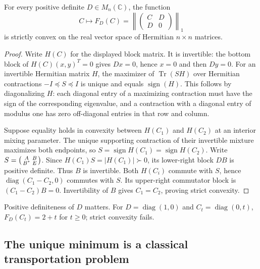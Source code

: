 \begin{lemma}\label{lem:strict-saddle}
For every positive definite $D\in M_n(\mathbb C)$, the function
\[
 C\longmapsto F_D(C)=
 \left\|\begin{pmatrix}C&D\\D&0\end{pmatrix}\right\|_1
\]
is strictly convex on the real vector space of Hermitian $n\times n$
matrices.
\end{lemma}
\begin{proof}
Write $H(C)$ for the displayed block matrix. It is invertible: the bottom
block of $H(C)(x,y)^T=0$ gives $Dx=0$, hence $x=0$ and then $Dy=0$.
For an invertible Hermitian matrix $H$, the maximizer of
$\operatorname{Tr}(SH)$ over Hermitian contractions $-I\preceq S\preceq I$
is unique and equals $\operatorname{sign}(H)$. This follows by diagonalizing
$H$: each diagonal entry of a maximizing contraction must have the sign
of the corresponding eigenvalue, and a contraction with a diagonal entry
of modulus one has zero off-diagonal entries in that row and column.

Suppose equality holds in convexity between $H(C_1)$ and $H(C_2)$ at an
interior mixing parameter. The unique supporting contraction of their
invertible mixture maximizes both endpoints, so
$S=\operatorname{sign}H(C_1)=\operatorname{sign}H(C_2)$.
Write $S=\begin{psmallmatrix}A&B\\B^*&E\end{psmallmatrix}$.
Since $H(C_1)S=|H(C_1)|\succ0$, its lower-right block $DB$ is positive
definite. Thus $B$ is invertible. Both $H(C_i)$ commute with $S$, hence
$\operatorname{diag}(C_1-C_2,0)$ commutes with $S$. Its upper-right
commutator block is $(C_1-C_2)B=0$. Invertibility of $B$ gives
$C_1=C_2$, proving strict convexity.
\end{proof}

Positive definiteness of $D$ matters. For
$D=\operatorname{diag}(1,0)$ and $C_t=\operatorname{diag}(0,t)$,
$F_D(C_t)=2+t$ for $t\ge0$; strict convexity fails.

\subsection{The unique minimum is a classical transportation problem}

